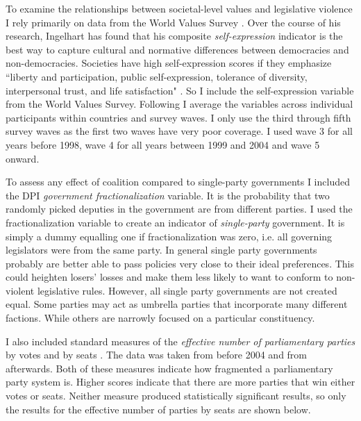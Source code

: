 \documentclass[a4paper]{article}\usepackage[]{graphicx}\usepackage[]{color}
\begin{document}
To examine the relationships between societal-level values and legislative violence I rely primarily on data from the World Values Survey \citeyearpar{WVS2009}. Over the course of his research, Ingelhart has found that his composite {\emph{self-expression}} indicator is the best way to capture cultural and normative differences between democracies and non-democracies. Societies have high self-expression scores if they emphasize ``liberty and participation, public self-expression, tolerance of diversity, interpersonal trust, and life satisfaction" \citep[64]{Inglehart2003}. So I include the self-expression variable from the World Values Survey. Following \cite{Inglehart2003} I average the variables across individual participants within countries and survey waves. I only use the third through fifth survey waves as the first two waves have very poor coverage. I used wave 3 for all years before 1998, wave 4 for all years between 1999 and 2004 and wave 5 onward. 

To assess any effect of coalition compared to single-party governments I included the DPI {\emph{government fractionalization}} variable. It is the probability that two randomly picked deputies in the government are from different parties. I used the fractionalization variable to create an indicator of {\emph{single-party}} government. It is simply a dummy equalling one if fractionalization was zero, i.e. all governing legislators were from the same party. In general single party governments probably are better able to pass policies very close to their ideal preferences. This could heighten losers' losses and make them less likely to want to conform to non-violent legislative rules. However, all single party governments are not created equal. Some parties may act as umbrella parties that incorporate many different factions. While others are narrowly focused on a particular constituency. 

I also included standard measures of the \emph{effective number of parliamentary parties} by votes and by seats \citep[see][]{Laakso1979, Taagepera1989}. The data was taken from \cite{Carey2011} before 2004 and from \cite{Gallagher2012} afterwards. Both of these measures indicate how fragmented a parliamentary party system is. Higher scores indicate that there are more parties that win either votes or seats. Neither measure produced statistically significant results, so only the results for the effective number of parties by seats are shown below.
\end{document}
